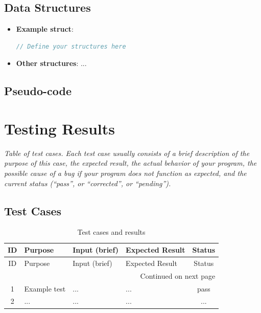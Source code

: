 \documentclass[12pt, a4paper]{report}
\newenvironment{vsCodeBlock}[1]
{%
    \begin{tcolorbox}[
        colback=vsBg, colframe=vsBg, arc=3pt, left=15pt, right=5pt,
        title=#1, fonttitle=\ttfamily\small\color{white},
        breakable,
        enhanced,
        coltext=white,
        before upper={\color{white}\lstset{basicstyle=\ttfamily\small\color{white}}},
        after={\par\nointerlineskip}
    ]%
    \lstset{basicstyle=\ttfamily\normalsize\color{white}}
}
{%
    \end{tcolorbox}
}
\begin{document}
\section{Data Structures}
\begin{itemize}
    \item \textbf{Example struct}:
\begin{vsCodeBlock}{}
    \begin{lstlisting}[language=C]
// Define your structures here
\end{lstlisting}
\end{vsCodeBlock}
    \item \textbf{Other structures}: ...
\end{itemize}

\section{Pseudo-code}

\chapter{Testing Results}

\textit{Table of test cases. Each test case usually consists of a brief description of the purpose of this case, the expected result, the actual behavior of your program, the possible cause of a bug if your program does not function as expected, and the current status (“pass”, or “corrected”, or “pending”).}

\section{Test Cases}

\begin{longtable}{|c|p{2.5cm}|p{4.5cm}|p{5cm}|c|}
\caption{Test cases and results} \\
\hline
ID & Purpose & Input (brief) & Expected Result & Status \\ \hline
\endfirsthead
\hline
ID & Purpose & Input (brief) & Expected Result & Status \\ \hline
\endhead
\hline \multicolumn{5}{r}{Continued on next page} \\
\endfoot
\hline
\endlastfoot

1 & Example test & ... & ... & pass \\ \hline
2 & ... & ... & ... & ... \\ \hline

\end{longtable}
\end{document}
